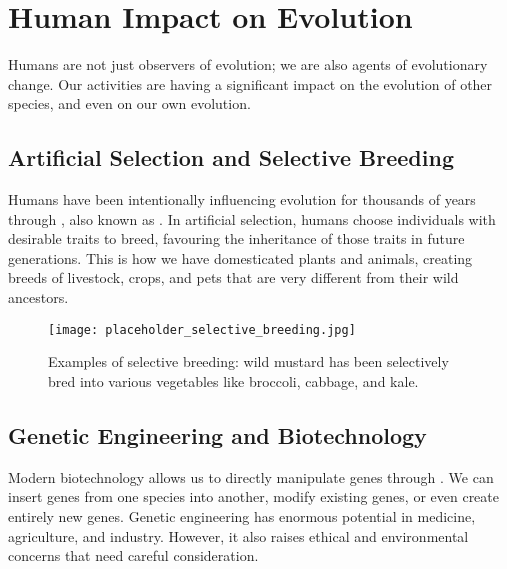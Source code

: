 \section{Human Impact on Evolution}

Humans are not just observers of evolution; we are also agents of evolutionary change.  Our activities are having a significant impact on the evolution of other species, and even on our own evolution.

\subsection{Artificial Selection and Selective Breeding}

Humans have been intentionally influencing evolution for thousands of years through , also known as .  In artificial selection, humans choose individuals with desirable traits to breed, favouring the inheritance of those traits in future generations.  This is how we have domesticated plants and animals, creating breeds of livestock, crops, and pets that are very different from their wild ancestors.

\begin{marginnote}
\end{marginnote}

\begin{figure}[htbp]
\centering
\texttt{[image: placeholder\_selective\_breeding.jpg]}
\caption{Examples of selective breeding: wild mustard has been selectively bred into various vegetables like broccoli, cabbage, and kale.}
\end{figure}

\subsection{Genetic Engineering and Biotechnology}

Modern biotechnology allows us to directly manipulate genes through .  We can insert genes from one species into another, modify existing genes, or even create entirely new genes.  Genetic engineering has enormous potential in medicine, agriculture, and industry.  However, it also raises ethical and environmental concerns that need careful consideration.


